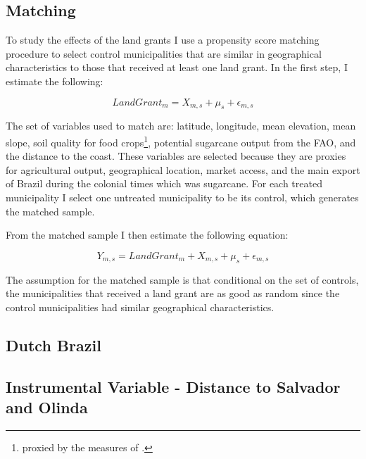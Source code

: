 \documentclass{article}
\begin{document}

\subsection{Matching}

To study the effects of the land grants I use a propensity score matching procedure to select control municipalities that are similar in geographical characteristics to those that received at least one land grant. In the first step, I estimate the following:

\begin{equation}
  LandGrant_m = X_{m,s} + \mu_s + \epsilon_{m,s}
\end{equation}

The set of variables used to match are: latitude, longitude, mean elevation, mean slope, soil quality for food crops\footnote{proxied by the measures of \textcite{Galor2016-ba}.}, potential sugarcane output from the FAO, and the distance to the coast. These variables are selected because they are proxies for agricultural output, geographical location, market access, and the main export of Brazil during the colonial times which was sugarcane. For each treated municipality I select one untreated municipality to be its control, which generates the matched sample.

From the matched sample I then estimate the following equation:

\begin{equation}
  Y_{m,s} = LandGrant_m + X_{m,s} + \mu_s + \epsilon_{m,s}
\end{equation}

The assumption for the matched sample is that conditional on the set of controls, the municipalities that received a land grant are as good as random since the control municipalities had similar geographical characteristics. 

\subsection{Dutch Brazil}

\subsection{Instrumental Variable - Distance to Salvador and Olinda}
\end{document}
